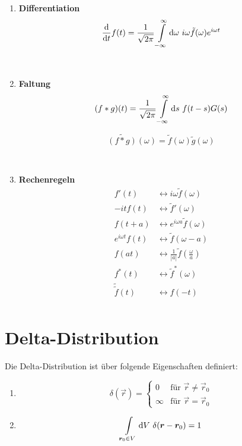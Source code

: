 \begin{enumerate}

\item \textbf{Differentiation}\\

\begin{equation*}
\frac{\mathrm{d}{}}{\mathrm{d}{t}}f(t)=\frac{1}{\sqrt{2\pi}}\int\limits_{{-\infty}}^{{\infty}}\mathrm{d}{\omega}\ i\omega\tilde{f}(\omega)e^{i\omega t}
\end{equation*}

\ \linebreak
\item \textbf{Faltung}\\

\begin{equation*}
(f*g)(t)=\frac{1}{\sqrt{2\pi}}\int\limits_{{-\infty}}^{{\infty}}\mathrm{d}{s}\ f(t-s)G(s)
\end{equation*}

\begin{equation*}
\widetilde{(f*g)}(\omega)=\tilde{f}(\omega)\tilde{g}(\omega)
\end{equation*}

\ \\
\item \textbf{Rechenregeln}\\

\begin{align*}
f'(t) & \leftrightarrow  i\omega\tilde{f}(\omega)\\
-itf(t) & \leftrightarrow \tilde{f}'(\omega)\\
f(t+a) & \leftrightarrow  e^{i\omega a}\tilde{f}(\omega)\\
e^{i\omega t}f(t) &\leftrightarrow  \tilde{f}(\omega-a)\\
f(at) & \leftrightarrow \frac{1}{|a|}\tilde{f}\left(\frac{\omega}{a}\right)\\
f^*(t) & \leftrightarrow  \tilde{f}^*(\omega)\\
\tilde{\tilde{f}}(t) & \leftrightarrow  f(-t)\\
\end{align*}
\end{enumerate}

\section{Delta-Distribution}

Die Delta-Distribution ist über folgende Eigenschaften definiert:

\begin{enumerate}
\item
\begin{equation*}
\delta(\vec{r}) = \begin{cases}
0 & \text{für }\vec{r}\neq\vec{r}_0\\
\infty & \text{für } \vec{r} = \vec{r}_0
\end{cases}
\end{equation*}

\item
\begin{equation*}
\int\limits_{\vec{r}_0\in V}\d V \ \delta({\vec{r}-\vec{r}_0}) = 1
\end{equation*}
\end{enumerate}


